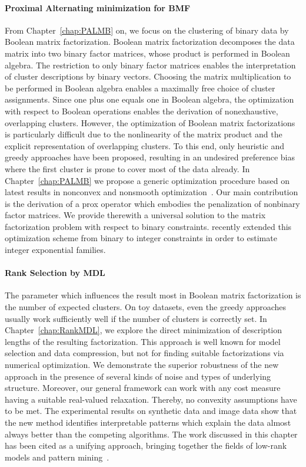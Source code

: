 \paragraph{Proximal Alternating minimization for BMF} From Chapter~\ref{chap:PALMB} on, we focus on the clustering of binary data by Boolean matrix factorization. Boolean matrix factorization decomposes the data matrix into two binary factor matrices, whose product is performed in Boolean algebra. The restriction to only binary factor matrices enables the interpretation of cluster descriptions by binary vectors. Choosing the matrix multiplication to be performed in Boolean algebra enables a maximally free choice of cluster assignments. Since one plus one equals one in Boolean algebra, the optimization with respect to Boolean operations enables the derivation of nonexhaustive, overlapping clusters. However, the optimization of Boolean matrix factorizations is particularly difficult due to the nonlinearity of the matrix product and the explicit representation of overlapping clusters. To this end, only heuristic and greedy approaches have been proposed, resulting in an undesired preference bias where the first cluster is prone to cover most of the data already. In Chapter~\ref{chap:PALMB} we propose a generic optimization procedure based on latest results in nonconvex and nonsmooth optimization~\citep{hess2017primping}. Our main contribution is the derivation of a prox operator which embodies the penalization of nonbinary factor matrices. We provide therewith a universal solution to the matrix factorization problem with respect to binary constraints. \cite{piatkowski2018exponential} recently  extended this optimization scheme from binary to integer constraints in order to estimate integer exponential families. 
\paragraph{Rank Selection by MDL} 
The parameter which influences the result most in Boolean matrix factorization is the number of expected clusters. On toy datasets, even the greedy approaches usually work sufficiently well if the number of clusters is correctly set. In Chapter~\ref{chap:RankMDL}, we explore the direct minimization of description lengths of the resulting factorization. This approach is well known for model selection and data compression, but not for finding suitable factorizations via numerical optimization. 
We demonstrate the superior robustness of the new approach in the presence of several kinds of noise and types of underlying structure. 
Moreover, our general framework can work with any cost measure having a suitable real-valued relaxation. Thereby, no convexity assumptions have to be met. 
The experimental results on synthetic data and image data show that the new method identifies interpretable patterns 
which explain the data almost always better than the competing algorithms. The work discussed in this chapter has been cited as a unifying approach, bringing together the fields of low-rank models and pattern mining~\citep{pfahler2017learning,ramirez2018binary,holzinger2017towards}. 
